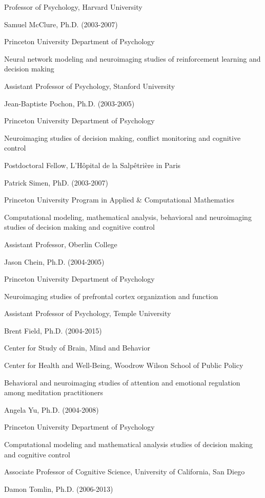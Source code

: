 \documentclass[10 pt]{article}
\begin{document}
Professor of Psychology, Harvard University
    \medskip

Samuel McClure, Ph.D. (2003-2007)

Princeton University Department of Psychology

Neural network modeling and neuroimaging studies of reinforcement learning and decision making

Assistant Professor of Psychology, Stanford University
    \medskip

Jean-Baptiste Pochon, Ph.D. (2003-2005)

Princeton University Department of Psychology

Neuroimaging studies of decision making, conflict monitoring and cognitive control

Postdoctoral Fellow, L'Hôpital de la Salpêtrière in Paris
    \medskip

Patrick Simen, PhD. (2003-2007)

Princeton University Program in Applied \& Computational Mathematics

Computational modeling, mathematical analysis, behavioral and neuroimaging studies of decision making and cognitive control

Assistant Professor, Oberlin College
    \medskip

Jason Chein, Ph.D. (2004-2005)

Princeton University Department of Psychology

Neuroimaging studies of prefrontal cortex organization and function

Assistant Professor of Psychology, Temple University
    \medskip

Brent Field, Ph.D. (2004-2015)

Center for Study of Brain, Mind and Behavior

Center for Health and Well-Being, Woodrow Wilson School of Public Policy

Behavioral and neuroimaging studies of attention and emotional regulation among meditation practitioners
    \medskip

Angela Yu, Ph.D. (2004-2008)

Princeton University Department of Psychology

Computational modeling and mathematical analysis studies of decision making and cognitive control

Associate Professor of Cognitive Science, University of California, San Diego
    \medskip

Damon Tomlin, Ph.D. (2006-2013)
\end{document}

